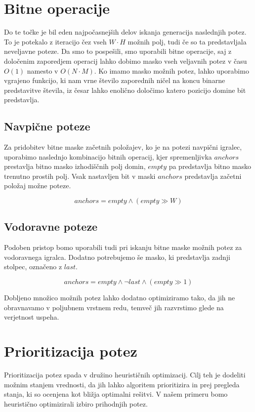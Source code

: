\documentclass[12pt]{report}
\begin{document}
\section{Bitne operacije}
Do te točke je bil eden najpočasnejših delov iskanja generacija naslednjih potez. To je potekalo z iteracijo čez vseh $W\cdot H$ možnih polj, tudi če so ta predstavljala neveljavne poteze. Da smo to pospešili, smo uporabili bitne operacije, saj z določenim zaporedjem operacij lahko dobimo masko vseh veljavnih potez v času $O(1)$ namesto v $O(N \cdot M)$. Ko imamo masko možnih potez, lahko uporabimo vgrajeno funkcijo, ki nam vrne število zaporednih ničel na koncu binarne predstavitve števila, iz česar lahko enolično določimo katero pozicijo domine bit predstavlja. 

\subsection*{Navpične poteze}
Za pridobitev bitne maske začetnih položajev, ko je na potezi navpični igralec, uporabimo naslednjo kombinacijo bitnih operacij, kjer spremenljivka $anchors$ prestavlja bitno masko izhodiščnih polj domin, $empty$ pa predstavlja bitno masko trenutno prostih polj. Vsak nastavljen bit v maski $anchors$ predstavlja začetni položaj možne poteze.

\[anchors = empty \land (empty\gg W)\]



\subsection*{Vodoravne poteze}
Podoben pristop bomo uporabili tudi pri iskanju bitne maske možnih potez za vodoravnega igralca. Dodatno potrebujemo še masko, ki predstavlja zadnji stolpec, označeno z $last$.

\[anchors = empty \land \lnot last  \land (empty\gg 1)\]



Dobljeno množico možnih potez lahko dodatno optimiziramo tako, da jih ne obravnavamo v poljubnem vrstnem redu, temveč jih razvrstimo glede na verjetnost uspeha.

\section{Prioritizacija potez}
Prioritizacija potez spada v družino heurističnih optimizacij. Cilj teh je dodeliti možnim stanjem vrednosti, da jih lahko algoritem prioritizira in prej pregleda stanja, ki so ocenjena kot bližja optimalni rešitvi. V našem primeru bomo heuristično optimizirali izbiro prihodnjih potez. 
\end{document}
